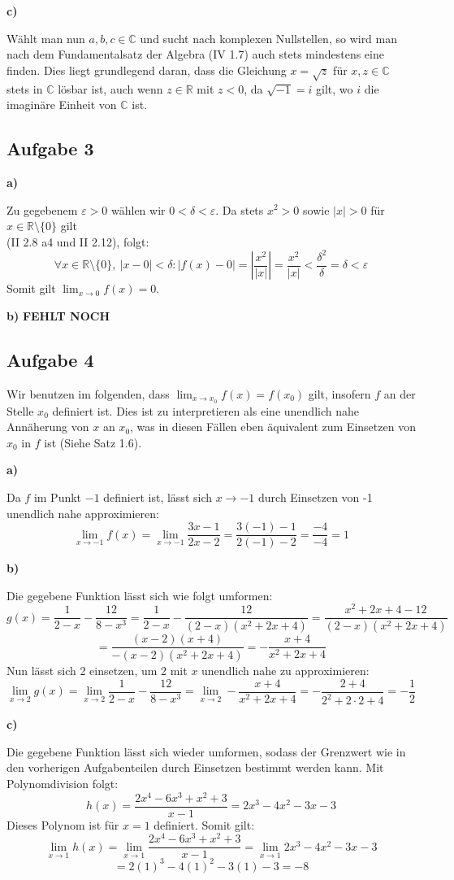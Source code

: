 \documentclass[a4paper,graphics,11pt]{article}
\newcommand{\aufgabe}[1]{\subsection*{Aufgabe #1}}
\begin{document}
\textbf{c)}

Wählt man nun $a,b,c \in \mathbb{C}$ und sucht nach komplexen Nullstellen,
so wird man nach dem Fundamentalsatz der Algebra (IV 1.7) auch stets mindestens eine finden.
Dies liegt grundlegend daran, dass die Gleichung $x = \sqrt{z}$ für $x,z \in \mathbb{C}$
stets in $\mathbb{C}$ lösbar ist, auch wenn $z \in \mathbb{R}$ mit $z < 0$, da $\sqrt{-1} = i$
gilt, wo $i$ die imaginäre Einheit von $\mathbb{C}$ ist.


\aufgabe{3}
\textbf{a)}

Zu gegebenem $\varepsilon > 0$ wählen wir $0 < \delta < \varepsilon$. Da stets
$x^2 > 0$  sowie $|x| > 0$ für $x \in \mathbb{R}\setminus\{0\}$ gilt\\
(II 2.8 a4 und II 2.12), folgt:
$$
    \forall x \in \mathbb{R}\setminus \{0\},\ |x-0| < \delta \colon
    |f(x)-0| = \left|\frac{x^2}{|x|}\right| = \frac{x^2}{|x|} < \frac{\delta^2}{\delta} 
    = \delta < \varepsilon
$$
Somit gilt $\lim_{x \to 0}\limits f(x) = 0$.

\textbf{b)}
\textbf{FEHLT NOCH}
$$


$$

\newpage
\aufgabe{4}
Wir benutzen im folgenden, dass $\lim_{x \to x_0}\limits f(x) = f(x_0)$ gilt, insofern $f$ an
der Stelle $x_0$ definiert ist. Dies ist zu interpretieren als eine unendlich nahe
Annäherung von $x$ an $x_0$, was in diesen Fällen eben äquivalent zum Einsetzen von $x_0$ in
$f$ ist (Siehe Satz 1.6).

\textbf{a)}

Da $f$ im Punkt $-1$ definiert ist, lässt sich $x\to-1$ durch Einsetzen von -1 unendlich
nahe approximieren:
$$
    \lim_{x \to -1} f(x)
    = \lim_{x \to -1} \frac{3x-1}{2x-2}
    = \frac{3(-1)-1}{2(-1)-2} 
    = \frac{-4}{-4}
    = 1
$$

\textbf{b)}

Die gegebene Funktion lässt sich wie folgt umformen:
$$
    g(x) = \frac{1}{2-x} - \frac{12}{8-x^3}
    = \frac{1}{2-x} - \frac{12}{(2-x)(x^2+2x+4)} 
    = \frac{x^2+2x+4-12}{(2-x)(x^2+2x+4)}
$$$$
    = \frac{(x-2)(x+4)}{-(x-2)(x^2+2x+4)}
    = -\frac{x+4}{x^2+2x+4}
$$
Nun lässt sich 2 einsetzen, um 2 mit $x$ unendlich nahe zu approximieren:
$$
    \lim_{x \to 2} g(x)
    = \lim_{x \to 2} \frac{1}{2-x} - \frac{12}{8-x^3}
    = \lim_{x \to 2} -\frac{x+4}{x^2+2x+4}
    = - \frac{2+4}{2^2+2\cdot 2 +4}
    = -\frac{1}{2}
$$

\textbf{c)}

Die gegebene Funktion lässt sich wieder umformen, sodass der Grenzwert wie in den vorherigen
Aufgabenteilen durch Einsetzen bestimmt werden kann. Mit Polynomdivision folgt:
$$
    h(x) = \frac{2x^4-6x^3+x^2+3}{x-1} = 2x^3-4x^2-3x-3
$$
Dieses Polynom ist für $x=1$ definiert. Somit gilt:
$$
    \lim_{x \to 1} h(x)
    = \lim_{x \to 1} \frac{2x^4-6x^3+x^2+3}{x-1}
    = \lim_{x \to 1} 2x^3-4x^2-3x-3
$$$$
    = 2(1)^3-4(1)^2-3(1)-3 = -8
$$
\end{document}
